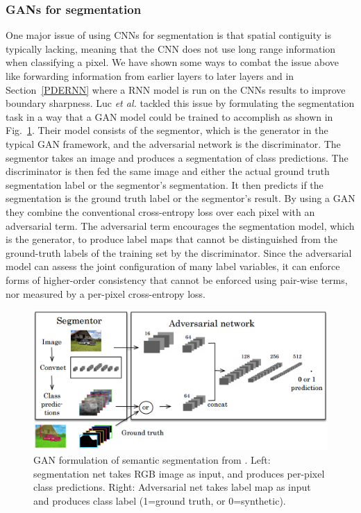 \subsubsection{GANs for segmentation}
One major issue of using CNNs for segmentation is that spatial contiguity is typically lacking, meaning that the CNN does not use long range information when classifying a pixel. We have shown some ways to combat the issue above like forwarding information from earlier layers to later layers and in Section~\ref{PDERNN} where a RNN model is run on the CNNs results to improve boundary sharpness. Luc \textit{et al.} \cite{luc2016semantic} tackled this issue by formulating the segmentation task in a way that a GAN model could be trained to accomplish as shown in Fig.~\ref{f:seggan}. Their model consists of the segmentor, which is the generator in the typical GAN framework, and the adversarial network is the discriminator. The segmentor takes an image and produces a segmentation of class predictions. The discriminator is then fed the same image and either the actual ground truth segmentation label or the segmentor's segmentation. It then predicts if the segmentation is the ground truth label or the segmentor's result. By using a GAN they combine the conventional cross-entropy loss over each pixel with an adversarial term. The adversarial term encourages the segmentation model, which is the generator, to produce label maps that cannot be distinguished from the ground-truth labels of the training set by the discriminator. Since the adversarial model can assess the joint configuration of many label variables, it can enforce forms of higher-order consistency that cannot be enforced using pair-wise terms, nor measured by a per-pixel cross-entropy loss.

\begin{figure}[h!]
	\centering
		\includegraphics[width=1.0\textwidth]{figures/seggan.png}
	\caption{GAN formulation of semantic segmentation from \cite{luc2016semantic}. Left: segmentation net takes RGB image as input, and produces per-pixel class predictions. Right: Adversarial net takes label map as input and produces class label (1=ground truth, or 0=synthetic).}
	\label{f:seggan}
\end{figure}


